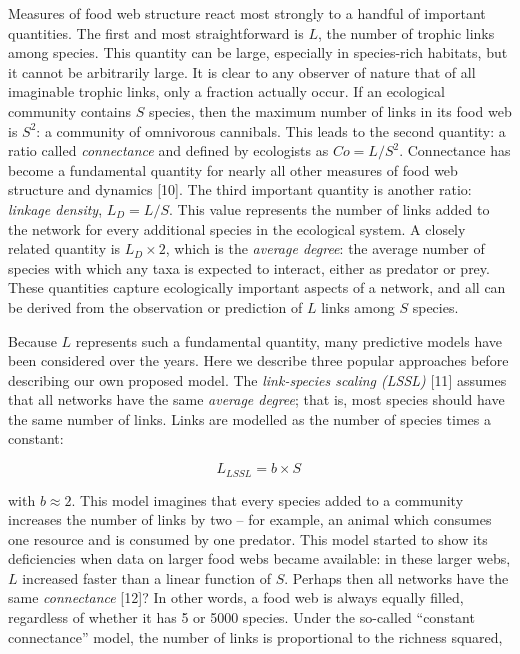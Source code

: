 \documentclass[12pt]{article}
\begin{document}
Measures of food web structure react most strongly to a handful of
important quantities. The first and most straightforward is \(L\), the
number of trophic links among species. This quantity can be large,
especially in species-rich habitats, but it cannot be arbitrarily large.
It is clear to any observer of nature that of all imaginable trophic
links, only a fraction actually occur. If an ecological community
contains \(S\) species, then the maximum number of links in its food web
is \(S^2\): a community of omnivorous cannibals. This leads to the
second quantity: a ratio called \emph{connectance} and defined by
ecologists as \(Co = L/S^2\). Connectance has become a fundamental
quantity for nearly all other measures of food web structure and
dynamics {[}10{]}. The third important quantity is another ratio:
\emph{linkage density}, \(L_D = L/S\). This value represents the number
of links added to the network for every additional species in the
ecological system. A closely related quantity is \(L_D \times 2\), which
is the \emph{average degree}: the average number of species with which
any taxa is expected to interact, either as predator or prey. These
quantities capture ecologically important aspects of a network, and all
can be derived from the observation or prediction of \(L\) links among
\(S\) species.

Because \(L\) represents such a fundamental quantity, many predictive
models have been considered over the years. Here we describe three
popular approaches before describing our own proposed model. The
\emph{link-species scaling (LSSL)} {[}11{]} assumes that all networks
have the same \emph{average degree}; that is, most species should have
the same number of links. Links are modelled as the number of species
times a constant:

\begin{equation} L_{LSSL} = b\times S \,\label{eq:lssl}\end{equation}

with \(b \approx 2\). This model imagines that every species added to a
community increases the number of links by two -- for example, an animal
which consumes one resource and is consumed by one predator. This model
started to show its deficiencies when data on larger food webs became
available: in these larger webs, \(L\) increased faster than a linear
function of \(S\). Perhaps then all networks have the same
\emph{connectance} {[}12{]}? In other words, a food web is always
equally filled, regardless of whether it has 5 or 5000 species. Under
the so-called ``constant connectance'' model, the number of links is
proportional to the richness squared,
\end{document}
